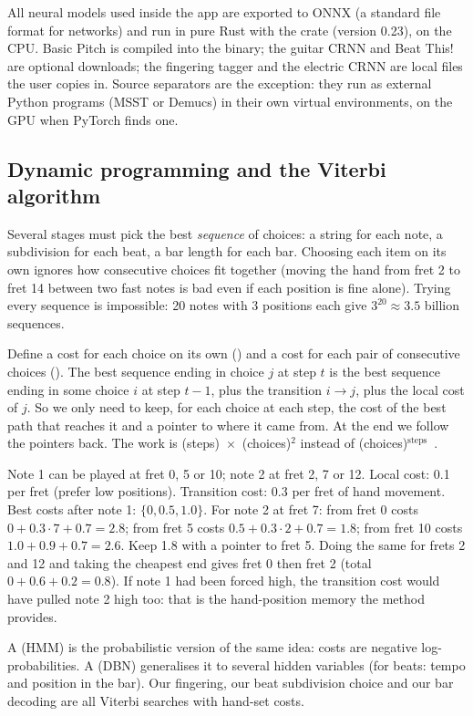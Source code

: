 \begin{inapp}
All neural models used inside the app are exported to ONNX (a standard file
format for networks) and run in pure Rust with the  crate
(version 0.23), on the CPU. Basic Pitch is compiled into the binary; the guitar
CRNN and Beat This! are optional downloads; the fingering tagger and the
electric CRNN are local files the user copies in. Source separators are the
exception: they run as external Python programs (MSST or Demucs) in their own
virtual environments, on the GPU when PyTorch finds one.
\end{inapp}

\subsection{Dynamic programming and the Viterbi algorithm}
\label{sec:viterbi}

Several stages must pick the best \emph{sequence} of choices: a string for each
note, a subdivision for each beat, a bar length for each bar. Choosing each
item on its own ignores how consecutive choices fit together (moving the hand
from fret 2 to fret 14 between two fast notes is bad even if each position is
fine alone). Trying every sequence is impossible: 20 notes with 3 positions each
give $3^{20} \approx 3.5$ billion sequences.

\begin{keyidea}
Define a cost for each choice on its own () and a cost for each
pair of consecutive choices (). The best sequence ending in
choice $j$ at step $t$ is the best sequence ending in some choice $i$ at step
$t-1$, plus the transition $i\to j$, plus the local cost of $j$. So we only need
to keep, for each choice at each step, the cost of the best path that reaches it
and a pointer to where it came from. At the end we follow the pointers back.
The work is (steps)~$\times$~(choices)$^2$ instead of
(choices)$^{\text{steps}}$~\cite{viterbi1967error}.
\end{keyidea}

\begin{worked}
Note 1 can be played at fret 0, 5 or 10; note 2 at fret 2, 7 or 12. Local cost:
0.1 per fret (prefer low positions). Transition cost: 0.3 per fret of hand
movement. Best costs after note 1: $\{0, 0.5, 1.0\}$. For note 2 at fret 7:
from fret 0 costs $0 + 0.3\cdot 7 + 0.7 = 2.8$; from fret 5 costs $0.5 + 0.3\cdot
2 + 0.7 = 1.8$; from fret 10 costs $1.0 + 0.9 + 0.7 = 2.6$. Keep 1.8 with a
pointer to fret 5. Doing the same for frets 2 and 12 and taking the cheapest
end gives fret 0 then fret 2 (total $0 + 0.6 + 0.2 = 0.8$). If note 1 had been
forced high, the transition cost would have pulled note 2 high too: that is
the hand-position memory the method provides.
\end{worked}

A  (HMM) is the probabilistic version of the same
idea: costs are negative log-probabilities. A 
(DBN) generalises it to several hidden variables (for beats: tempo and position
in the bar). Our fingering, our beat subdivision choice and our bar decoding are
all Viterbi searches with hand-set costs.
